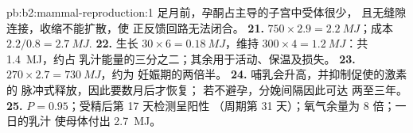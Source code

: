 \begin{solution}{pb:b2:mammal-reproduction:1}
足月前，孕酮占主导的子宫中受体很少，
且无缝隙连接，收缩不能扩散，使
正反馈回路无法闭合。
\textbf{21.} $750\times 2.9 = \qty{2.2}{MJ}$；成本 $2.2/0.8 =
\qty{2.7}{MJ}$.
\textbf{22.} 生长 $30\times 6 = \qty{0.18}{MJ}$，维持
$300\times 4 = \qty{1.2}{MJ}$：共 \qty{1.4}{MJ}，约占
乳汁能量的三分之二；其余用于活动、保温及损失。
\textbf{23.} $270\times 2.7 = \qty{730}{MJ}$，约为
妊娠期的两倍半。
\textbf{24.} 哺乳会升高，并抑制促使的激素的
脉冲式释放，因此要数月后才恢复；
若不避孕，分娩间隔因此可达
两至三年。
\textbf{25.} $P = 0.95$；受精后第 17 天检测呈阳性
（周期第 31 天）；氧气余量为 8 倍；一日的乳汁
使母体付出 \qty{2.7}{MJ}。
\end{solution}
